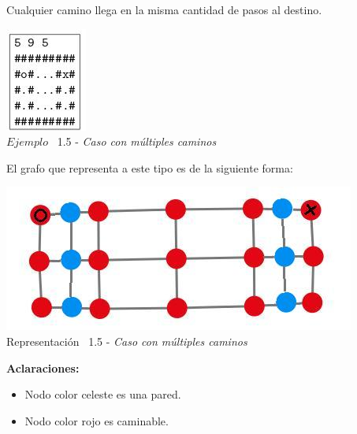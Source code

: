 Cualquier camino llega en la misma cantidad de pasos al destino.

\vspace*{0.3cm} \vspace*{0.3cm}
  \begin{center}
 \includegraphics[scale=1.6]{./EJ1/ej1random.jpeg}
\\ {$Ejemplo$ \ 1.5 - \textit{Caso con m\'ultiples caminos}}
  \end{center}
  \vspace*{0.3cm}

El grafo que representa a este tipo es de la siguiente forma:\\

\vspace*{0.3cm} \vspace*{0.3cm}
  \begin{center}
 \includegraphics[scale=0.5]{./EJ1/ej1graforandom.jpeg}
 \\{Representaci\'on \ 1.5 - \textit{Caso con m\'ultiples caminos}}
  \end{center}
  \vspace*{0.3cm}

\textbf{Aclaraciones:} 
\begin{itemize}
\item Nodo color celeste es una pared.
\item Nodo color rojo es caminable.
\end{itemize}
